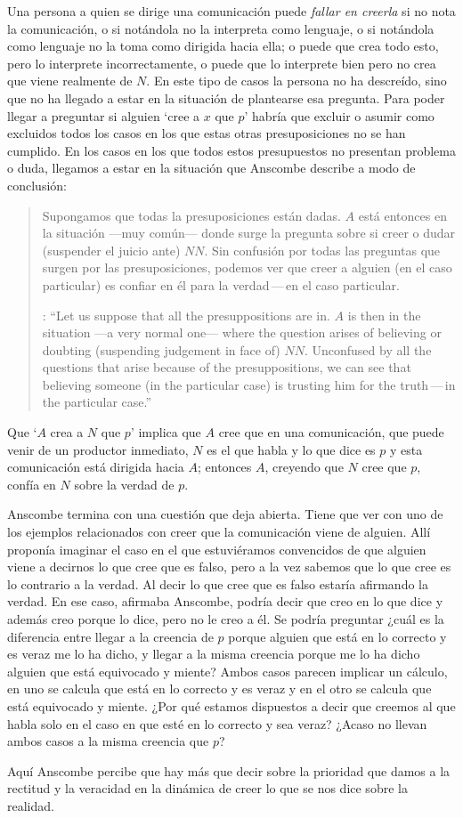 Una persona a quien se dirige una comunicación puede \emph{fallar en creerla} si no nota la comunicación, o si notándola no la interpreta como lenguaje, o si notándola como lenguaje no la toma como dirigida hacia ella; o puede que crea todo esto, pero lo interprete incorrectamente, o puede que lo interprete bien pero no crea que viene realmente de $N$. En este tipo de casos la persona no ha descreído, sino que no ha llegado a estar en la situación de plantearse esa pregunta. Para poder llegar a preguntar si alguien `cree a $x$ que $p$' habría que excluir o asumir como excluidos todos los casos en los que estas otras presuposiciones no se han cumplido. En los casos en los que todos estos presupuestos no presentan problema o duda, llegamos a estar en la situación que Anscombe describe a modo de conclusión: \blockquote[{\cite[9]{anscombe2008faith:tobelieve}}: \enquote{Let us suppose that all the presuppositions are in. $A$ is then in the situation ---a very normal one--- where the question arises of believing or doubting (suspending judgement in face of) $NN$. Unconfused by all the questions that arise because of the presuppositions, we can see that believing someone (in the particular case) is trusting him for the truth\,---\,in the particular case.}]{Supongamos que todas la presuposiciones están dadas. $A$ está entonces en la situación ---muy común--- donde surge la pregunta sobre si creer o dudar (suspender el juicio ante) $NN$. Sin confusión por todas las preguntas que surgen por las presuposiciones, podemos ver que creer a alguien (en el caso particular) es confiar en él para la verdad\,---\,en el caso particular.} Que `$A$ crea a $N$ que $p$' implica que $A$ cree que en una comunicación, que puede venir de un productor inmediato, $N$ es el que habla y lo que dice es $p$ y esta comunicación está dirigida hacia $A$; entonces $A$, creyendo que $N$ cree que $p$, confía en $N$ sobre la verdad de $p$.

Anscombe termina con una cuestión que deja abierta. Tiene que ver con uno de los ejemplos relacionados con creer que la comunicación viene de alguien. Allí proponía imaginar el caso en el que estuviéramos convencidos de que alguien viene a decirnos lo que cree que es falso, pero a la vez sabemos que lo que cree es lo contrario a la verdad. Al decir lo que cree que es falso estaría afirmando la verdad. En ese caso, afirmaba Anscombe, podría decir que creo en lo que dice y además creo porque lo dice, pero no le creo a él. Se podría preguntar ¿cuál es la diferencia entre llegar a la creencia de $p$ porque alguien que está en lo correcto y es veraz me lo ha dicho, y llegar a la misma creencia porque me lo ha dicho alguien que está equivocado y miente? Ambos casos parecen implicar un cálculo, en uno se calcula que está en lo correcto y es veraz y en el otro se calcula que está equivocado y miente. ¿Por qué estamos dispuestos a decir que creemos al que habla solo en el caso en que esté en lo correcto y sea veraz? ¿Acaso no llevan ambos casos a la misma creencia que $p$?

Aquí Anscombe percibe que hay más que decir sobre la prioridad que damos a la rectitud y la veracidad en la dinámica de creer lo que se nos dice sobre la realidad.
